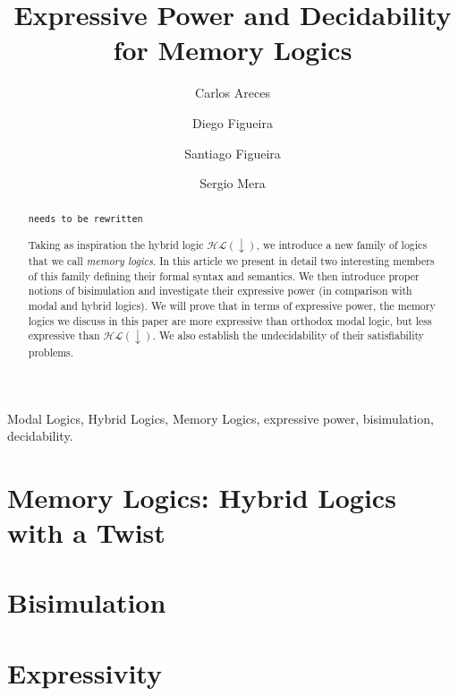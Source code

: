 \documentclass{elsarticle}
\newcounter{tbsnr}
\newenvironment{tbs}
{\addtocounter{tbsnr}{1}\par\bigskip \noindent\fbox{\thetbsnr}
\hspace*{\fill}\begin{minipage}{12cm}\tt}
{\end{minipage}\hspace*{\fill}\bigskip}
\newcommand{\tb}[1]{\begin{tbs}{\footnotesize #1}\end{tbs}}
\newcommand{\down}{{\downarrow}}
\newcommand{\HL}{\mathcal{HL}}
\newlength{\esize}
\begin{document}
\begin{frontmatter}
\title{Expressive Power and Decidability for Memory Logics}

\author[LORIA]       {Carlos Areces}
\author[CACHAN]      {Diego Figueira}
\author[UBA,CONICET] {Santiago Figueira}
\author[UBA]         {Sergio Mera}
\address[LORIA]      {INRIA Nancy Grand Est, France}
\address[CACHAN]     {LSV, ENS Cachan, CNRS, INRIA, France}
\address[UBA]        {Departamento de Computaci\'on, FCEyN\\Universidad de Buenos Aires, Argentina}
\address[CONICET]        {CONICET, Argentina}


\begin{abstract}
\tb{needs to be rewritten}
Taking as inspiration the hybrid logic $\HL(\down)$, we introduce a
new family of logics that we call \emph{memory logics}.  In this
article we present in detail two interesting members of this family
defining their formal syntax and semantics. We then introduce
proper notions of bisimulation and investigate their expressive power
(in comparison with modal and hybrid logics). We will prove that in
terms of expressive power, the memory logics we discuss in this
paper are more expressive than orthodox modal logic, but less
expressive than $\HL(\down)$. We also establish the undecidability
of their satisfiability problems.
\end{abstract}

\begin{keyword}
Modal Logics, Hybrid Logics, Memory Logics, expressive power, bisimulation,
decidability.
\end{keyword}
\end{frontmatter}


\section{Memory Logics: Hybrid Logics with a Twist}\label{twist}


\section{Bisimulation}



\section{Expressivity}

\end{document}
